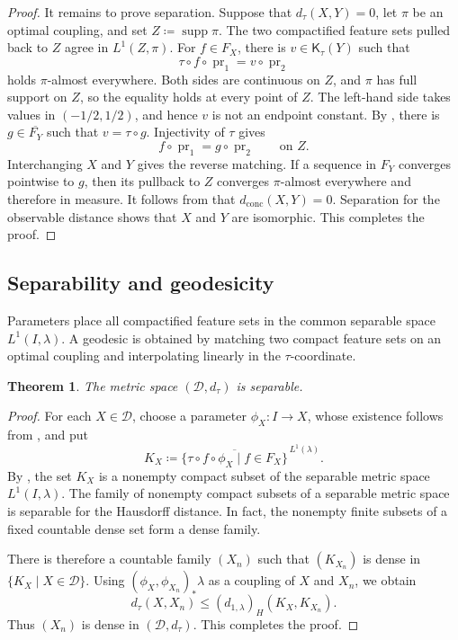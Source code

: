 \documentclass[11pt]{amsart}
\theoremstyle{plain}
\newtheorem{theorem}{Theorem}[section]
\theoremstyle{definition}
\theoremstyle{remark}
\newcommand{\D}{\mathcal D}
\newcommand{\Kc}{\mathsf K}
\newcommand{\dconc}{d_{\mathrm{conc}}}
\newcommand{\dtau}{d_{\tau}}
\DeclareMathOperator{\pr}{pr}
\DeclareMathOperator{\supp}{supp}
\begin{document}
\begin{proof}
It remains to prove separation. Suppose that $\dtau(X,Y)=0$, let $\pi$ be an optimal coupling, and set $Z\coloneqq\supp\pi$. The two compactified feature sets pulled back to $Z$ agree in $L^1(Z,\pi)$. For $f\in F_X$, there is $v\in\Kc_\tau(Y)$ such that
\[
\tau\circ f\circ\pr_1=v\circ\pr_2
\]
holds $\pi$-almost everywhere. Both sides are continuous on $Z$, and $\pi$ has full support on $Z$, so the equality holds at every point of $Z$. The left-hand side takes values in $(-1/2,1/2)$, and hence $v$ is not an endpoint constant. By , there is $g\in\overline{F_Y}$ such that $v=\tau\circ g$. Injectivity of $\tau$ gives
\[
f\circ\pr_1=g\circ\pr_2\qquad\text{on }Z.
\]
Interchanging $X$ and $Y$ gives the reverse matching. If a sequence in $F_Y$ converges pointwise to $g$, then its pullback to $Z$ converges $\pi$-almost everywhere and therefore in measure. It follows from  that $\dconc(X,Y)=0$. Separation for the observable distance \cite[Theorem~3.10]{hanika2022gds} shows that $X$ and $Y$ are isomorphic. This completes the proof.
\end{proof}

\subsection{Separability and geodesicity}
\label{subsec:dtau-geometry}

Parameters place all compactified feature sets in the common separable space $L^1(I,\lambda)$. A geodesic is obtained by matching two compact feature sets on an optimal coupling and interpolating linearly in the $\tau$-coordinate.

\begin{theorem}
\label{thm:dtau-separable}
The metric space $(\D,\dtau)$ is separable.
\end{theorem}

\begin{proof}
For each $X\in\D$, choose a parameter $\phi_X\colon I\to X$, whose existence follows from \cite[Theorem~17.41]{kechris1995classical}, and put
\[
K_X\coloneqq
\overline{\{\tau\circ f\circ\phi_X\mid f\in F_X\}}^{\,L^1(\lambda)}.
\]
By , the set $K_X$ is a nonempty compact subset of the separable metric space $L^1(I,\lambda)$. The family of nonempty compact subsets of a separable metric space is separable for the Hausdorff distance. In fact, the nonempty finite subsets of a fixed countable dense set form a dense family.

There is therefore a countable family $(X_n)$ such that $(K_{X_n})$ is dense in $\{K_X\mid X\in\D\}$. Using $(\phi_X,\phi_{X_n})_*\lambda$ as a coupling of $X$ and $X_n$, we obtain
\[
\dtau(X,X_n)\leq(d_{1,\lambda})_H(K_X,K_{X_n}).
\]
Thus $(X_n)$ is dense in $(\D,\dtau)$. This completes the proof.
\end{proof}
\end{document}
